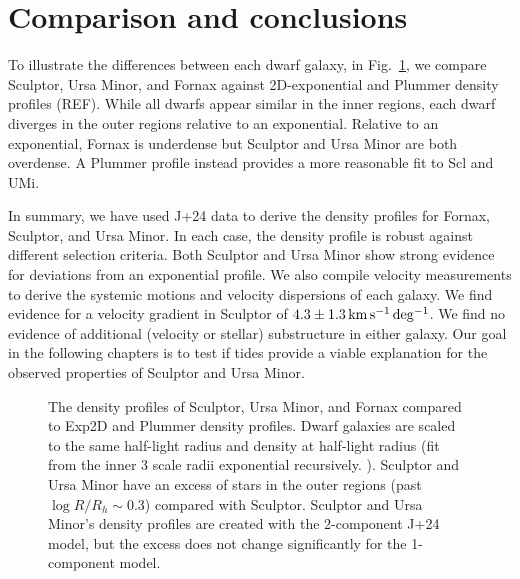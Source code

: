 \section{Comparison and conclusions}\label{comparison-and-conclusions}

To illustrate the differences between each dwarf galaxy, in
Fig.~\ref{fig:classical_dwarfs_densities}, we compare Sculptor, Ursa
Minor, and Fornax against 2D-exponential and Plummer density profiles
(REF). While all dwarfs appear similar in the inner regions, each dwarf
diverges in the outer regions relative to an exponential. Relative to an
exponential, Fornax is underdense but Sculptor and Ursa Minor are both
overdense. A Plummer profile instead provides a more reasonable fit to
Scl and UMi.

In summary, we have used J+24 data to derive the density profiles for
Fornax, Sculptor, and Ursa Minor. In each case, the density profile is
robust against different selection criteria. Both Sculptor and Ursa
Minor show strong evidence for deviations from an exponential profile.
We also compile velocity measurements to derive the systemic motions and
velocity dispersions of each galaxy. We find evidence for a velocity
gradient in Sculptor of \(4.3\pm1.3\,{\rm km\,s^{-1}\,deg^{-1}}\). We find no evidence of
additional (velocity or stellar) substructure in either galaxy. Our goal
in the following chapters is to test if tides provide a viable
explanation for the observed properties of Sculptor and Ursa Minor.

\begin{figure}
\centering
{}
\caption[Classical dwarf density profiles]{The density profiles of
Sculptor, Ursa Minor, and Fornax compared to Exp2D and Plummer density
profiles. Dwarf galaxies are scaled to the same half-light radius and
density at half-light radius (fit from the inner 3 scale radii
exponential recursively. ). Sculptor and Ursa Minor have an excess of
stars in the outer regions (past \(\log R/R_h \sim 0.3\)) compared with
Sculptor. Sculptor and Ursa Minor's density profiles are created with
the 2-component J+24 model, but the excess does not change significantly
for the 1-component model.}\label{fig:classical_dwarfs_densities}
\end{figure}
